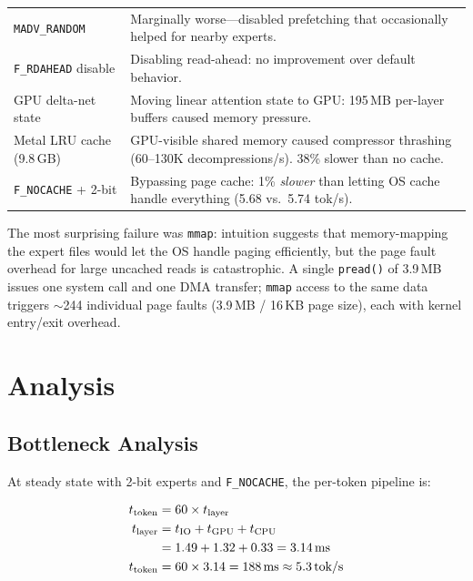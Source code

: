 \documentclass[11pt,twocolumn]{article}
\begin{document}
\begin{table}[t]
\begin{tabular}{@{}p{2.2cm}p{4.3cm}@{}}
\addlinespace
\texttt{MADV\_RANDOM} & Marginally worse---disabled prefetching that occasionally helped for nearby experts. \\
\addlinespace
\texttt{F\_RDAHEAD} disable & Disabling read-ahead: no improvement over default behavior. \\
\addlinespace
GPU delta-net state & Moving linear attention state to GPU: 195\,MB per-layer buffers caused memory pressure. \\
\addlinespace
Metal LRU cache (9.8\,GB) & GPU-visible shared memory caused compressor thrashing (60--130K decompressions/s). 38\% slower than no cache. \\
\addlinespace
\texttt{F\_NOCACHE} + 2-bit & Bypassing page cache: 1\% \emph{slower} than letting OS cache handle everything (5.68 vs.\ 5.74 tok/s). \\
\bottomrule
\end{tabular}
\end{table}

The most surprising failure was \texttt{mmap}: intuition suggests that memory-mapping the expert files would let the OS handle paging efficiently, but the page fault overhead for large uncached reads is catastrophic.
A single \texttt{pread()} of 3.9\,MB issues one system call and one DMA transfer; \texttt{mmap} access to the same data triggers $\sim$244 individual page faults (3.9\,MB / 16\,KB page size), each with kernel entry/exit overhead.

\section{Analysis}

\subsection{Bottleneck Analysis}

At steady state with 2-bit experts and \texttt{F\_NOCACHE}, the per-token pipeline is:

\begin{align}
t_\text{token} &= 60 \times t_\text{layer} \nonumber \\
t_\text{layer} &= t_\text{IO} + t_\text{GPU} + t_\text{CPU} \nonumber \\
               &= 1.49 + 1.32 + 0.33 = 3.14\text{\,ms} \nonumber \\
t_\text{token} &= 60 \times 3.14 = 188\text{\,ms} \approx 5.3\text{\,tok/s} \nonumber
\end{align}
\end{document}
